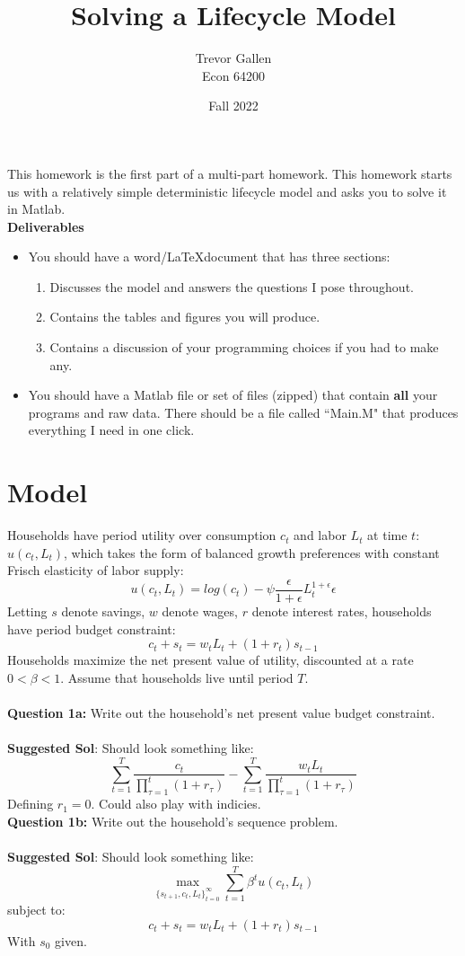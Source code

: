 \documentclass[11pt]{article}
\title{Solving a Lifecycle Model}
\author{ Trevor Gallen \\ Econ 64200 }
\date{Fall 2022}
\begin{document}


\maketitle

This homework is the first part of a multi-part homework.  This homework starts us with a relatively simple deterministic lifecycle model and asks you to solve it in Matlab.\\

\textbf{Deliverables}
\begin{itemize}
\item You should have a word/\LaTeX document that has three sections: 
\begin{enumerate}
\item Discusses the model and answers the questions I pose throughout.
\item Contains the tables and figures you will produce.
\item Contains a discussion of your programming choices if you had to make any.
\end{enumerate}
\item You should have a Matlab file or set of files (zipped) that contain \textbf{all} your programs and raw data.  There should be a file called ``Main.M" that produces everything I need in one click.
\end{itemize}


\section{Model}
Households have period utility over consumption $c_t$ and labor $L_t$ at time $t$: $u(c_t,L_t)$, which takes the form of balanced growth preferences with constant Frisch elasticity of labor supply:
$$u(c_t,L_t)=log(c_t)-\psi \frac{\epsilon}{1+\epsilon}L_t^{1+\epsilon}{\epsilon}$$
Letting $s$ denote savings, $w$ denote wages, $r$ denote interest rates, households have period budget constraint:
$$c_t+s_t=w_tL_t+(1+r_t)s_{t-1}$$
Households maximize the net present value of utility, discounted at a rate $0<\beta<1$. Assume that households live until period $T$.\\
\ \\
\textbf{Question 1a:} Write out the household's net present value budget constraint.\\
\ \\
\textbf{Suggested Sol}: Should look something like:
$$\sum_{t=1}^T\frac{c_t}{\prod_{\tau=1}^t(1+r_\tau)}-\sum_{t=1}^T\frac{w_tL_t}{\prod_{\tau=1}^t(1+r_\tau)}$$
Defining $r_1=0$.  Could also play with indicies.
\ \\
\textbf{Question 1b:} Write out the household's sequence problem.\\
 \ \\
\textbf{Suggested Sol}: Should look something like:
$$\underset{\{s_{t+1},c_t,L_t\}_{t=0}^\infty}{\max}\sum_{t=1}^T\beta^tu(c_t,L_t)$$
subject to:
$$c_t+s_t=w_tL_t+(1+r_t)s_{t-1}$$
With $s_{0}$ given.\ \\
\end{document}
